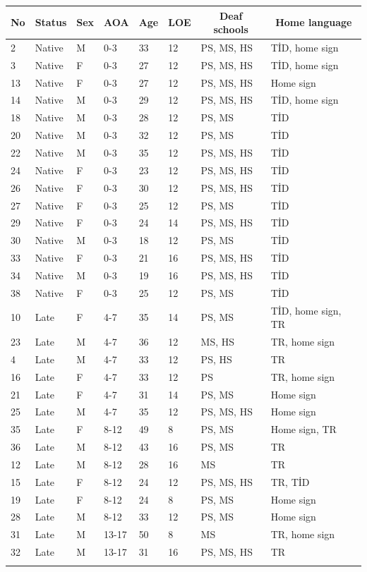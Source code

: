 \documentclass[]{elsarticle} %
\begin{document}
\begin{table}[hbt!]
\begin{center}
\begin{threeparttable}
{\begin{tabular}{llllllll}
\toprule
No & \multicolumn{1}{c}{Status} & \multicolumn{1}{c}{Sex} & \multicolumn{1}{c}{AOA} & \multicolumn{1}{c}{Age} & \multicolumn{1}{c}{LOE} & \multicolumn{1}{c}{Deaf schools} & \multicolumn{1}{c}{Home language}\\
\midrule
2 & Native & M & 0-3 & 33 & 12 & PS, MS, HS & TİD, home sign\\
3 & Native & F & 0-3 & 27 & 12 & PS, MS, HS & TİD, home sign\\
13 & Native & F & 0-3 & 27 & 12 & PS, MS, HS & Home sign\\
14 & Native & M & 0-3 & 29 & 12 & PS, MS, HS & TİD, home sign\\
18 & Native & M & 0-3 & 28 & 12 & PS, MS & TİD\\
20 & Native & M & 0-3 & 32 & 12 & PS, MS & TİD\\
22 & Native & M & 0-3 & 35 & 12 & PS, MS, HS & TİD\\
24 & Native & F & 0-3 & 23 & 12 & PS, MS, HS & TİD\\
26 & Native & F & 0-3 & 30 & 12 & PS, MS, HS & TİD\\
27 & Native & F & 0-3 & 25 & 12 & PS, MS & TİD\\
29 & Native & F & 0-3 & 24 & 14 & PS, MS, HS & TİD\\
30 & Native & M & 0-3 & 18 & 12 & PS, MS & TİD\\
33 & Native & F & 0-3 & 21 & 16 & PS, MS, HS & TİD\\
34 & Native & M & 0-3 & 19 & 16 & PS, MS, HS & TİD\\
38 & Native & F & 0-3 & 25 & 12 & PS, MS & TİD\\
10 & Late & F & 4-7 & 35 & 14 & PS, MS & TİD, home sign, TR\\
23 & Late & M & 4-7 & 36 & 12 & MS, HS & TR, home sign\\
4 & Late & M & 4-7 & 33 & 12 & PS, HS & TR\\
16 & Late & F & 4-7 & 33 & 12 & PS & TR, home sign\\
21 & Late & F & 4-7 & 31 & 14 & PS, MS & Home sign\\
25 & Late & M & 4-7 & 35 & 12 & PS, MS, HS & Home sign\\
35 & Late & F & 8-12 & 49 & 8 & PS, MS & Home sign, TR\\
36 & Late & M & 8-12 & 43 & 16 & PS, MS & TR\\
12 & Late & M & 8-12 & 28 & 16 & MS & TR\\
15 & Late & F & 8-12 & 24 & 12 & PS, MS, HS & TR, TİD\\
19 & Late & F & 8-12 & 24 & 8 & PS, MS & Home sign\\
28 & Late & M & 8-12 & 33 & 12 & PS, MS & Home sign\\
31 & Late & M & 13-17 & 50 & 8 & MS & TR, home sign\\
32 & Late & M & 13-17 & 31 & 16 & PS, MS, HS & TR\\
\bottomrule
\addlinespace
\end{tabular}

}
\end{threeparttable}
\end{center}
\end{table}
\end{document}
